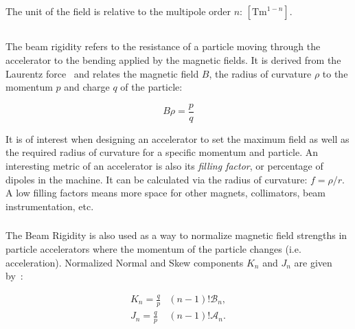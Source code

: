 The unit of the field is relative to the multipole order $n$: $[\text{Tm}^{1-n}]$.


\subsection{}

\subsubsection{}

The beam rigidity refers to the resistance of a particle moving through the accelerator to the
bending applied by the magnetic fields. It is derived from the Laurentz force~\cite{dilly_corrections_2022}
and relates the magnetic field $B$, the radius of curvature $\rho$ to the momentum $p$ and charge $q$
of the particle:

\begin{equation}
    B \rho = \frac{p}{q}
    \label{eq:magnetic_fields_beam_rigidity}
\end{equation}

It is of interest when designing an accelerator to set the maximum field as well as the required
radius of curvature for a specific momentum and particle.
An interesting metric of an accelerator is also its \textit{filling factor}, or percentage of
dipoles in the machine. It can be calculated via the radius of curvature: $f = \rho / r$. A low 
filling factors means more space for other magnets, collimators, beam instrumentation, etc.

\subsubsection{}

The Beam Rigidity is also used as a way to normalize magnetic field strengths in particle
accelerators where the momentum of the particle changes (i.e. acceleration).
Normalized Normal and Skew components $K_n$ and $J_n$ are given by~\cite{wolf_engineering_2001}:

\begin{equation}
    \begin{aligned}
        K_n =  \frac{q}{p} &(n-1)! \mathcal{B}_n, \\ 
        J_n =  \frac{q}{p} &(n-1)! \mathcal{A}_n.
    \end{aligned}
    \label{eq:magnetic_fields_normalized}
\end{equation}



